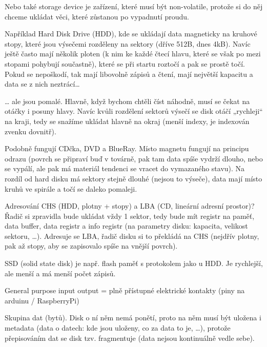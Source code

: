 \documentclass[12pt]{article}					%
\begin{document}
    \begin{definice}
        Nebo také storage device je zařízení, které musí být non-volatile, protože si do něj chceme ukládat věci, které zůstanou po vypadnutí proudu.

        Například Hard Disk Drive (HDD), kde se ukládají data magneticky na kruhové stopy, které jsou výsečemi rozděleny na sektory (dříve 512B, dnes 4kB). Navíc ještě často mají několik ploten (k nim ke každé čtecí hlavu, které se však po mezi stopami pohybují součastně), které se při startu roztočí a pak se prostě točí. Pokud se nepoškodí, tak mají libovolně zápisů a čtení, mají největší kapacitu a data se z nich neztrácí…

        … ale jsou pomalé. Hlavně, když bychom chtěli číst náhodně, musí se čekat na otáčky i posuny hlavy. Navíc kvůli rozdělení sektorů výsečí se disk otáčí „rychleji“ na kraji, tedy se snažíme ukládat hlavně na okraj (menší indexy, je indexován zvenku dovnitř).

        Podobně fungují CDčka, DVD a BlueRay. Místo magnetu fungují na principu odrazu (povrch se připraví buď v továrně, pak tam data spíše vydrží dlouho, nebo se vypálí, ale pak má materiál tendenci se vracet do vymazaného stavu). Na rozdíl od hard disku má sektory stejně dlouhé (nejsou to výseče), data mají místo kruhů ve spirále a točí se daleko pomaleji.

        Adresování CHS (HDD, plotny + stopy) a LBA (CD, lineární adresní prostor)? Řadič si zpravidla bude ukládat vždy 1 sektor, tedy bude mít registr na paměť, data buffer, data registr a info registr (na parametry disku: kapacita, velikost sektoru, …). Adresuje se LBA, řadič disku si to překládá na CHS (nejdřív plotny, pak až stopy, aby se zapisovalo spíše na vnější povrch).

        SSD (solid state disk) je např. flash paměť s protokolem jako u HDD. Je rychlejší, ale menší a má menší počet zápisů.
    \end{definice}

    \begin{definice}[GPIO]
        General purpose input output = plně přístupné elektrické kontakty (piny na arduinu / RaspberryPi)
    \end{definice}

    \begin{definice}[Soubro]
        Skupina dat (bytů). Disk o ní něm nemá ponětí, proto na něm musí být uložena i metadata (data o datech: kde jsou uloženy, co za data to je, …), protože přepisováním dat se disk tzv. fragmentuje (data nejsou kontinuálně vedle sebe).
    \end{definice}
\end{document}
